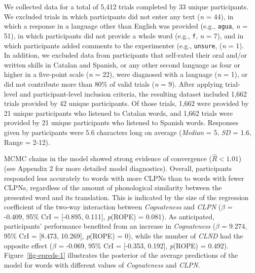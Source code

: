 \documentclass[
]{article}
\begin{document}
We collected data for a total of 5,412 trials completed by 33 unique
participants. We excluded trials in which participants did not enter any
text (\emph{n} = 44), in which a response in a language other than
English was provided (e.g., \texttt{agua}, \emph{n} = 51), in which
participants did not provide a whole word (e.g., \texttt{f}, \emph{n} =
7), and in which participants added comments to the experimenter (e.g.,
\texttt{unsure}, (\emph{n} = 1). In addition, we excluded data from
participants that self-rated their oral and/or written skills in Catalan
and Spanish, or any other second language as four or higher in a
five-point scale (\emph{n} = 22), were diagnosed with a language
(\emph{n} = 1), or did not contribute more than 80\% of valid trials
(\emph{n} = 9). After applying trial-level and participant-level
inclusion criteria, the resulting dataset included 1,662 trials provided
by 42 unique participants. Of those trials, 1,662 were provided by 21
unique participants who listened to Catalan words, and 1,662 trials were
provided by 21 unique participants who listened to Spanish words.
Responses given by participants were 5.6 characters long on average
(\emph{Median} = 5, \emph{SD} = 1.6, Range = 2-12).

MCMC chains in the model showed strong evidence of convergence
(\(\hat{R}<1.01\)) (see Appendix 2 for more detailed model diagnostics).
Overall, participants responded less accurately to words with more CLPNs
than to words with fewer CLPNs, regardless of the amount of phonological
similarity between the presented word and its translation. This is
indicated by the size of the regression coefficient of the two-way
interaction between \emph{Cognateness} and \emph{CLPN} (\(\beta\) =
-0.409, 95\% CrI = {[}-0.895, 0.111{]}, \emph{p}(ROPE) = 0.081). As
anticipated, participants' performance benefited from an increase in
\emph{Cognateness} (\(\beta\) = 9.274, 95\% CrI = {[}8.473, 10.269{]},
\emph{p}(ROPE) = 0), while the number of \emph{CLND} had the opposite
effect (\(\beta\) = -0.069, 95\% CrI = {[}-0.353, 0.192{]},
\emph{p}(ROPE) = 0.492). Figure~\ref{fig-epreds-1} illustrates the
posterior of the average predictions of the model for words with
different values of \emph{Cognateness} and \emph{CLPN}.
\end{document}
